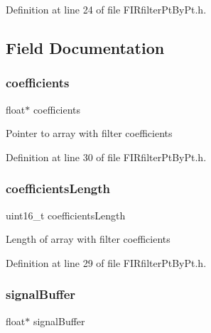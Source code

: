 Definition at line 24 of file F\+I\+Rfilter\+Pt\+By\+Pt.\+h.



\subsection{Field Documentation}
\mbox{\label{struct_f_i_rfilter_object_adc634462fd82995ba67a6a50ce478b6f_adc634462fd82995ba67a6a50ce478b6f}} 
\subsubsection{\texorpdfstring{coefficients}{coefficients}}
{\footnotesize\ttfamily float$\ast$ coefficients}

Pointer to array with filter coefficients 

Definition at line 30 of file F\+I\+Rfilter\+Pt\+By\+Pt.\+h.

\mbox{\label{struct_f_i_rfilter_object_a2e7b6600f7f4a3f9eccd7b7d6c0799a0_a2e7b6600f7f4a3f9eccd7b7d6c0799a0}} 
\subsubsection{\texorpdfstring{coefficientsLength}{coefficientsLength}}
{\footnotesize\ttfamily uint16\+\_\+t coefficients\+Length}

Length of array with filter coefficients 

Definition at line 29 of file F\+I\+Rfilter\+Pt\+By\+Pt.\+h.

\mbox{\label{struct_f_i_rfilter_object_aae0d64d2a7939f8302edb830dc123c86_aae0d64d2a7939f8302edb830dc123c86}} 
\subsubsection{\texorpdfstring{signalBuffer}{signalBuffer}}
{\footnotesize\ttfamily float$\ast$ signal\+Buffer}

